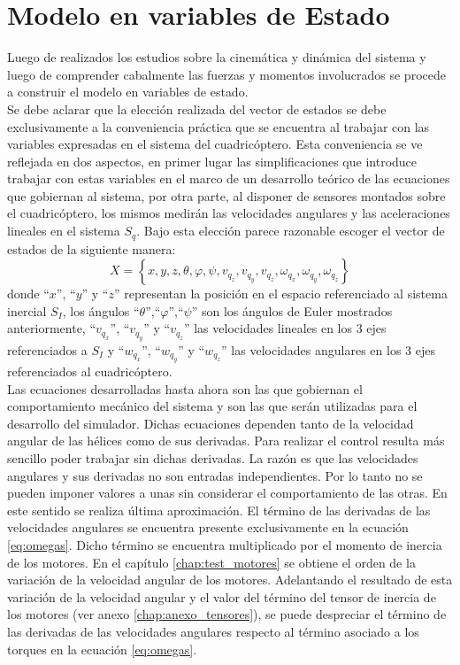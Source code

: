 \documentclass[main]{subfiles}
\begin{document}
\section{Modelo en variables de Estado}

Luego de realizados los estudios sobre la cinem\'atica y din\'amica del sistema y luego de comprender cabalmente las fuerzas y momentos involucrados se procede a construir el modelo en variables de estado.\\ 

Se debe aclarar que la elecci\'on realizada del vector de estados se debe exclusivamente a la conveniencia pr\'actica que se encuentra al trabajar con las variables expresadas en el sistema del cuadric\'optero. Esta conveniencia se ve reflejada en dos aspectos, en primer lugar las simplificaciones que introduce trabajar con estas variables en el marco de un desarrollo te\'orico de las ecuaciones que gobiernan al sistema, por otra parte, al disponer de sensores montados sobre el cuadric\'optero, los mismos medir\'an las velocidades angulares y las aceleraciones lineales en el sistema $S_q$. Bajo esta elecci\'on parece razonable escoger el vector de estados de la siguiente manera:
\begin{equation}
\boxed{X=\left\lbrace  x,y,z, \theta,\varphi,\psi, v_{q_z},v_{q_y},v_{q_z},\omega_{q_x},\omega_{q_y},\omega_{q_z} \right\rbrace}
\end{equation}
donde ``$x$'', ``$y$'' y ``$z$'' representan la posici\'on en el espacio referenciado al sistema inercial $S_I$, los \'angulos ``$\theta$'',``$\varphi$'',``$\psi$'' son los \'angulos de Euler mostrados anteriormente, ``$v_{q_x}$'', ``$v_{q_y}$'' y ``$v_{q_z}$'' las velocidades lineales en los 3 ejes referenciados a $S_I$ y ``$w_{q_x}$'', ``$w_{q_y}$'' y ``$w_{q_z}$'' las velocidades angulares en los 3 ejes referenciados al cuadric\'optero.\\

Las ecuaciones desarrolladas hasta ahora son las que gobiernan el comportamiento mec\'anico del sistema y son las que ser\'an utilizadas para el desarrollo del simulador. Dichas ecuaciones dependen tanto de la velocidad angular de las h\'elices como de sus derivadas. Para realizar el control resulta m\'as sencillo poder trabajar sin dichas derivadas. La raz\'on es que las velocidades angulares y sus derivadas no son entradas independientes. Por lo tanto no se pueden imponer valores a unas sin considerar el comportamiento de las otras. En este sentido se realiza \'ultima aproximaci\'on. El t\'ermino de las derivadas de las velocidades angulares se encuentra presente exclusivamente en la ecuaci\'on \ref{eq:omegas}. Dicho t\'ermino se encuentra multiplicado por el momento de inercia de los motores. En el cap\'itulo \ref{chap:test_motores} se obtiene el orden de la variaci\'on de la velocidad angular de los motores. Adelantando el resultado de esta variaci\'on de la velocidad angular y el valor del t\'ermino del tensor de inercia de los motores (ver anexo \ref{chap:anexo_tensores}), se puede despreciar el t\'ermino de las derivadas de las velocidades angulares respecto al t\'ermino asociado a los torques en la ecuaci\'on \ref{eq:omegas}.\\
\end{document}
